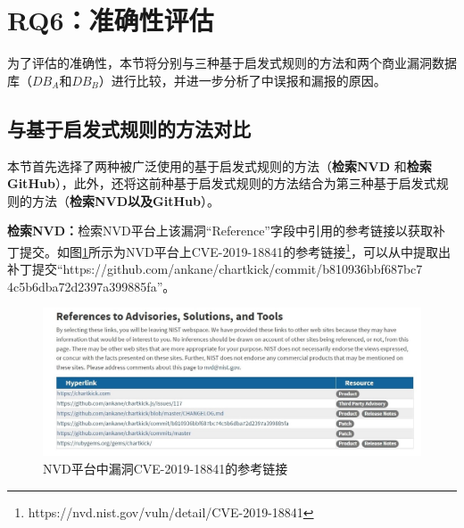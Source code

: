 \section{RQ6：准确性评估}\label{sec:accuracy-evaluation}

为了评估\tool 的准确性，本节将\tool 分别与三种基于启发式规则的方法和两个商业漏洞数据库（$DB_A$和$DB_B$）进行比较，并进一步分析了\tool 中误报和漏报的原因。

\subsection{与基于启发式规则的方法对比}
本节首先选择了两种被广泛使用的基于启发式规则的方法（\textbf{检索NVD}\cite{duan2019automating,li2016vulpecker,li2018vuldeepecker} 和\textbf{检索GitHub}\cite{you2017semfuzz,Wang2020empirical}），此外，还将这前种基于启发式规则的方法结合为第三种基于启发式规则的方法（\textbf{检索NVD以及GitHub}）。

\textbf{检索NVD：}检索NVD平台上该漏洞“Reference”字段中引用的参考链接以获取补丁提交。如图\ref{fig:CVE-2019-18841}所示为NVD平台上CVE-2019-18841的参考链接\footnote{https://nvd.nist.gov/vuln/detail/CVE-2019-18841}，可以从中提取出补丁提交“https://github.com/ankane/chartkick/commit/b810936bbf687bc7\\4c5b6dba72d2397a399885fa”。
\begin{figure}[!t]
    \centering
    \includegraphics[scale=0.44]{fig/NVD-2019-18841}
    \caption{NVD平台中漏洞CVE-2019-18841的参考链接}\label{fig:CVE-2019-18841}
\end{figure}

